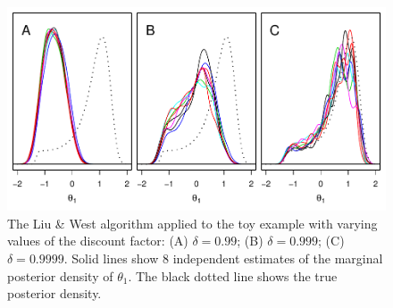 \documentclass[11pt]{article}
\newcommand\reviewerVersion[2]{#1} %
\begin{document}
\begin{figure}
\begin{center}


\reviewerVersion{
\vspace{-3mm}

\includegraphics{figS2}

\vspace{-8mm}

}
{\medskip\texttt{Figure pdf in figS2.pdf. For review, please view supp-if2-review.pdf.}

\vspace{5mm}}  


\end{center}
\caption{The Liu \& West  algorithm \cite{janeliu01} applied to the toy example with varying values of the discount factor:
(A) $\delta=0.99$; (B) $\delta=0.999$; (C) $\delta=0.9999$.
Solid lines show 8 independent estimates of the marginal posterior density of $\theta_1$. The black dotted line shows the true posterior density.
}
\label{fig:sup:LW}
\end{figure}
\end{document}
